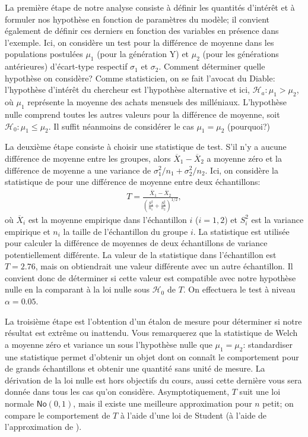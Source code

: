 \documentclass[
  11pt,
  letterpaper,
]{article}
\theoremstyle{definition}
\theoremstyle{definition}
\theoremstyle{definition}
\theoremstyle{definition}
\theoremstyle{remark}
\begin{document}
La première étape de notre analyse consiste à définir les quantités d'intérêt et à formuler nos hypothèse en fonction de paramètres du modèle; il convient également de définir ces derniers en fonction des variables en présence dans l'exemple. Ici, on considère un test pour la différence de moyenne dans les populations postulées \(\mu_1\) (pour la génération Y) et \(\mu_2\) (pour les générations antérieures) d'écart-type respectif \(\sigma_1\) et \(\sigma_2\). Comment déterminer quelle hypothèse on considère? Comme statisticien, on se fait l'avocat du Diable: l'hypothèse d'intérêt du chercheur est l'hypothèse alternative et ici, \(\mathscr{H}_a: \mu_1 > \mu_2\), où \(\mu_1\) représente la moyenne des achats mensuels des milléniaux. L'hypothèse nulle comprend toutes les autres valeurs pour la différence de moyenne, soit \(\mathscr{H}_0: \mu_1 \leq \mu_2\). Il suffit néanmoins de considérer le cas \(\mu_1=\mu_2\) (pourquoi?)

La deuxième étape consiste à choisir une statistique de test. S'il n'y a aucune différence de moyenne entre les groupes, alors \(\overline{X}_1-\overline{X}_2\) a moyenne zéro et la différence de moyenne a une variance de \(\sigma^2_1/n_1+\sigma^2_2/n_2\). Ici, on considère la statistique de \citet{Welch1947} pour une différence de moyenne entre deux échantillons:
\begin{align*}
T = \frac{\overline{X}_1 - \overline{X}_2}{\left(\frac{S_1^2}{n_1}+\frac{S_2^2}{n_2} \right)^{1/2}}, \end{align*}
où \(\overline{X}_i\) est la moyenne empirique dans l'échantillon \(i\) (\(i=1, 2\)) et \(S_i^2\) est la variance empirique et \(n_i\) la taille de l'échantillon du groupe \(i\). La statistique est utilisée pour calculer la différence de moyennes de deux échantillons de variance potentiellement différente. La valeur de la statistique dans l'échantillon est \(T=2.76\), mais on obtiendrait une valeur différente avec un autre échantillon. Il convient donc de déterminer si cette valeur est compatible avec notre hypothèse nulle en la comparant à la loi nulle sous \(\mathscr{H}_0\) de \(T\). On effectuera le test à niveau \(\alpha=0.05\).

La troisième étape est l'obtention d'un étalon de mesure pour déterminer si notre résultat est extrême ou inattendu. Vous remarquerez que la statistique de Welch a moyenne zéro et variance un sous l'hypothèse nulle que \(\mu_1=\mu_2\): standardiser une statistique permet d'obtenir un objet dont on connaît le comportement pour de grands échantillons et obtenir une quantité sans unité de mesure. La dérivation de la loi nulle est hors objectifs du cours, aussi cette dernière vous sera donnée dans tous les cas qu'on considère. Asymptotiquement, \(T\) suit une loi normale \(\mathsf{No}(0, 1)\), mais il existe une meilleure approximation pour \(n\) petit; on compare le comportement de \(T\) à l'aide d'une loi de Student (à l'aide de l'approximation de \citet{Satterthwaite1946}).
\end{document}
